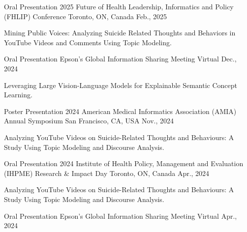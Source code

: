 
\vspace*{0.05cm}
\begin{cventries}
\cventry
{Oral Presentation} %
{2025 Future of Health Leadership, Informatics and Policy (FHLIP) Conference} %
{Toronto, ON, Canada} %
{Feb., 2025} %
{ %
\begin{cvitems}
\item {Mining Public Voices: Analyzing Suicide Related Thoughts and Behaviors in YouTube Videos and Comments Using Topic Modeling.}
\end{cvitems}
}
\cventry
{Oral Presentation} %
{Epson's Global Information Sharing Meeting} %
{Virtual} %
{Dec., 2024} %
{ %
\begin{cvitems}
\item {Leveraging Large Vision-Language Models for Explainable Semantic Concept Learning.}
\end{cvitems}
}
\cventry
{Poster Presentation} %
{2024 American Medical Informatics Association (AMIA) Annual Symposium} %
{San Francisco, CA, USA} %
{Nov., 2024} %
{ %
\begin{cvitems}
\item {Analyzing YouTube Videos on Suicide-Related Thoughts and Behaviours: A Study Using Topic Modeling and Discourse Analysis.}
\end{cvitems}
}
\cventry
{Oral Presentation} %
{2024 Institute of Health Policy, Management and Evaluation (IHPME) Research \& Impact Day} %
{Toronto, ON, Canada} %
{Apr., 2024} %
{ %
\begin{cvitems}
\item {Analyzing YouTube Videos on Suicide-Related Thoughts and Behaviours: A Study Using Topic Modeling and Discourse Analysis.}
\end{cvitems}
}
\cventry
{Oral Presentation} %
{Epson's Global Information Sharing Meeting} %
{Virtual} %
{Apr., 2024} %
{ %
\begin{cvitems}

\end{cvitems}}
\end{cventries}
